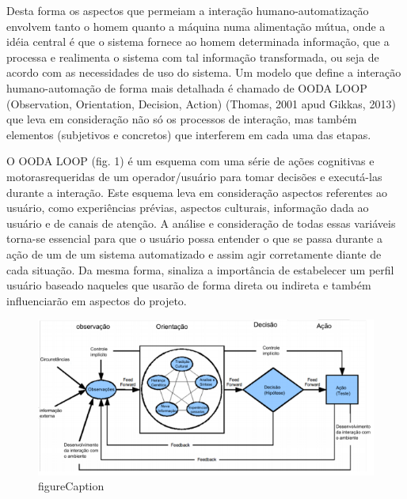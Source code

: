 \documentclass[12pt,a4paper]{article}
\begin{document}
Desta forma os aspectos que permeiam a interação humano-automatização envolvem tanto o homem quanto a máquina numa alimentação mútua, 
onde a idéia central é que o sistema fornece ao homem determinada informação, que a processa e realimenta o sistema com tal informação 
transformada, ou seja de acordo com as necessidades de uso do sistema. 
Um modelo que define a interação humano-automação de forma mais detalhada é chamado de OODA LOOP (Observation, Orientation, Decision, Action) 
(Thomas, 2001 apud Gikkas, 2013) que leva em consideração não só os processos de interação, mas também elementos (subjetivos e concretos) que 
interferem em cada uma das etapas. 

O OODA LOOP (fig. 1) é um esquema com uma série de ações cognitivas e motorasrequeridas de um operador/usuário para tomar decisões e executá-las 
durante a interação. Este esquema leva em consideração aspectos referentes ao usuário, como experiências prévias, aspectos culturais, informação 
dada ao usuário e de canais de atenção. A análise e consideração de todas essas variáveis torna-se essencial para que o usuário possa entender o 
que se passa durante a ação de um de um sistema automatizado e assim agir corretamente diante de cada situação. Da mesma forma, sinaliza a 
importância de estabelecer um perfil usuário baseado naqueles que usarão de forma direta ou indireta e também influenciarão em aspectos do projeto.

\begin{figure}[htp]
\begin{center}
  \includegraphics[width=figureWidth]{figs/imgs/oodaLoop.jpg}
  \caption[labelInTOC]{figureCaption}
  \label{figureLabel}
\end{center}
\end{figure}
 
\end{document}
